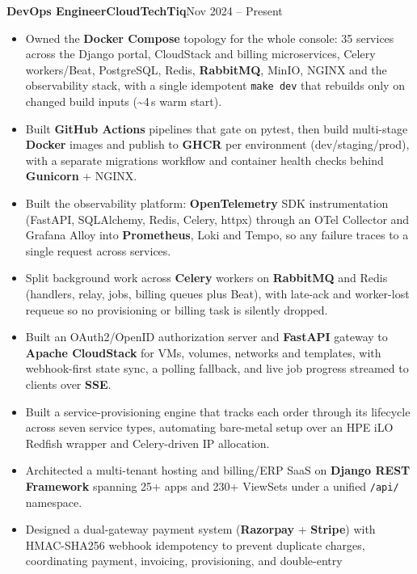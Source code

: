 \documentclass[11pt,a4paper]{article}
\newcommand{\entry}[3]{%
  \vspace{4.5pt}\noindent\textbf{#1}\hfill\textbf{#2}\hfill{\color{subtlegray}#3}\par\vspace{2pt}}
\begin{document}
\entry{DevOps Engineer}{CloudTechTiq}{Nov 2024 -- Present}
\begin{itemize}
  \item Owned the \textbf{Docker Compose} topology for the whole console: 35
        services across the Django portal, CloudStack and billing microservices,
        Celery workers/Beat, PostgreSQL, Redis, \textbf{RabbitMQ}, MinIO, NGINX
        and the observability stack, with a single idempotent \texttt{make dev}
        that rebuilds only on changed build inputs (\textasciitilde4\,s warm start).
  \item Built \textbf{GitHub Actions} pipelines that gate on pytest, then build
        multi-stage \textbf{Docker} images and publish to \textbf{GHCR} per
        environment (dev/staging/prod), with a separate migrations workflow and
        container health checks behind \textbf{Gunicorn} + NGINX.
  \item Built the observability platform: \textbf{OpenTelemetry} SDK
        instrumentation (FastAPI, SQLAlchemy, Redis, Celery, httpx) through an
        OTel Collector and Grafana Alloy into \textbf{Prometheus}, Loki and
        Tempo, so any failure traces to a single request across services.
  \item Split background work across \textbf{Celery} workers on
        \textbf{RabbitMQ} and Redis (handlers, relay, jobs, billing queues plus
        Beat), with late-ack and worker-lost requeue so no provisioning or
        billing task is silently dropped.
  \item Built an OAuth2/OpenID authorization server and \textbf{FastAPI}
        gateway to \textbf{Apache CloudStack} for VMs, volumes, networks and
        templates, with webhook-first state sync, a polling fallback, and live
        job progress streamed to clients over \textbf{SSE}.
  \item Built a service-provisioning engine that tracks each order through its
        lifecycle across seven service types, automating bare-metal setup over an
        HPE iLO Redfish wrapper and Celery-driven IP allocation.
  \item Architected a multi-tenant hosting and billing/ERP SaaS on \textbf{Django
        REST Framework} spanning 25+ apps and 230+ ViewSets under a unified
        \texttt{/api/} namespace.
  \item Designed a dual-gateway payment system (\textbf{Razorpay} +
        \textbf{Stripe}) with HMAC-SHA256 webhook idempotency to prevent duplicate
        charges, coordinating payment, invoicing, provisioning, and double-entry

\end{itemize}
\end{document}
